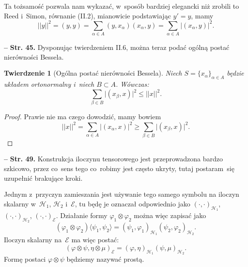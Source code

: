 \documentclass[a4paper,11pt]{article}
\newtheorem{twr}{Twierdzenie}
\newcommand{\mc}{\mathcal}
\newcommand{\al}{\alpha}
\newcommand{\be}{\beta}
\newcommand{\vp}{\varphi}
\newcommand{\Hc}{\mc{H}}
\newcommand{\subs}{\subset}
\newcommand{\ot}{\otimes}
\newcommand{\Sum}{\sum\limits}
\newcommand{\lket}{\langle}
\newcommand{\rket}{\rangle}
\providecommand{\absj}[1]{\lvert #1 \rvert}
\newcommand{\norm}[1]{\left|\left| #1 \right|\right|}
\newcommand{\tb}{\textbf}
\newcommand{\noi}{\noindent}
\newcommand{\start}{\noi \tb{--} {}}
\newcommand{\Str}[1]{\tb{Str. #1.}}
\begin{document}
Ta tożsamość pozwala nam wykazać, w~sposób bardziej elegancki niż
zrobili to Reed i~Simon, równanie (II.2), mianowicie podstawiając
$y' = y$, mamy
\begin{equation*}
  \norm{ y }^{ 2 } = ( y, y ) = \Sum_{ \al \in A } ( y, x_{ \al } )
  ( x_{ \al }, y ) = \Sum_{ \al \in A } \absj{ ( x_{ \al }, y ) }^{ 2 }.
\end{equation*}

\start \Str{45} Dysponując twierdzeniem II.6, można teraz podać ogólną
postać nierówności Bessela.

\begin{twr}[Ogólna postać nierówności Bessela]
  Niech $S = \{ x_{ \al } \}_{ \al \in A }$ będzie układem
  ortonormalny i~niech $B \subs A$. Wówczas:
  \begin{equation*}
    \Sum_{ \be \in B } \absj{ ( x_{ \be }, x ) }^{ 2 } \leq \norm{ x }^{ 2 }.
  \end{equation*}
\end{twr}
\begin{proof}
  Prawie nie ma czego dowodzić, mamy bowiem
  \begin{equation*}
    \norm{ x }^{ 2 } = \Sum_{ \al \in A } \absj{ ( x_{ \al }, x ) }^{ 2 }
    \geq \Sum_{ \be \in B } \absj{ ( x_{ \be }, x ) }^{ 2 }.
  \end{equation*}
\end{proof}


\start \Str{49} Konstrukcja iloczynu tensorowego jest przeprowadzona
bardzo szkicowo, przez co~sens tego co~robimy jest często ukryty,
tutaj postaram~się uzupełnić brakujące kroki.

Jednym z~przyczyn zamieszania jest używanie tego samego symbolu na
iloczyn skalarny w~$\Hc_{ 1 }$, $\Hc_{ 2 }$ i~$\mc{E}$, tu będę je
oznaczał odpowiednio jako $( \cdot, \cdot )_{ \Hc_{ 1 } }$,
$( \cdot, \cdot )_{ \Hc_{ 2 } }$, $( \cdot, \cdot )_{ \mc{ E } }$.
Działanie formy $\vp_{ 1 } \ot \vp_{ 2 }$ można więc zapisać jako
\begin{displaymath}
  ( \vp_{ 1 } \ot \vp_{ 2 } )\lket \psi_{ 1 }, \psi_{ 2 } \rket
  = ( \psi_{ 1 }, \vp_{ 1 } )_{ \Hc_{ 1 } } ( \psi_{ 2 },
  \vp_{ 2 } )_{ \Hc_{ 2 } }.
\end{displaymath}
Iloczyn skalarny na~$\mc{E}$ ma więc postać:
\begin{displaymath}
  ( \vp \ot \psi, \eta \ot \mu )_{ \mc{E} } = ( \vp, \eta )_{ \Hc_{ 1 } }
  ( \psi, \mu )_{ \Hc_{ 2 } }.
\end{displaymath}
Formę postaci $\vp \ot \psi$ będziemy nazywać prostą.
\end{document}
